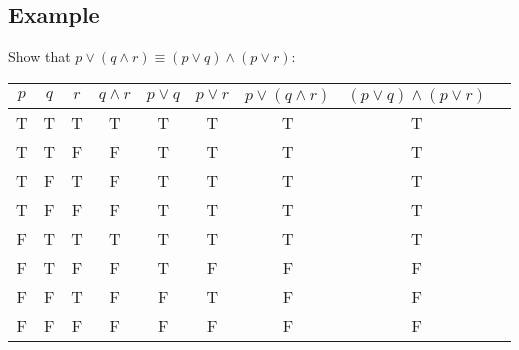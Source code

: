 \documentclass{math}
\begin{document}
\subsection*{Example}
Show that \( p \vee (q \wedge r) \equiv (p \vee q) \wedge (p \vee r) \):
\begin{center}
  \begin{tabular}{|c|c|c|c|c|c|c|c|c|}
    \hline
    \( p \) & \( q \) & \( r \) & \( q \wedge r \) & \( p \vee q \) &
    \( p \vee r \) & \( p \vee (q \wedge r) \) &
    \( (p \vee q) \wedge (p \vee r) \) \\ \hline
    T & T & T & T & T & T & T & T \\ \hline
    T & T & F & F & T & T & T & T \\ \hline
    T & F & T & F & T & T & T & T \\ \hline
    T & F & F & F & T & T & T & T \\ \hline
    F & T & T & T & T & T & T & T \\ \hline
    F & T & F & F & T & F & F & F \\ \hline
    F & F & T & F & F & T & F & F \\ \hline
    F & F & F & F & F & F & F & F \\ \hline
  \end{tabular}
\end{center}
\end{document}
